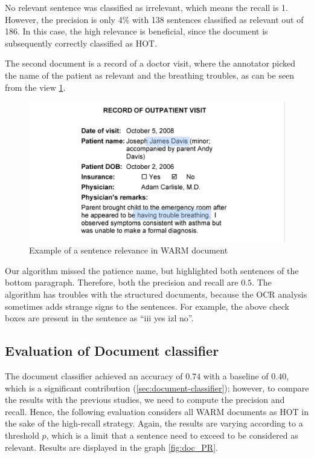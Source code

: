 \documentclass[
  digital, %
  notable,   %
  nolof,     %
  nolot,     %
]{fithesis3}
\begin{document}
No relevant sentence was classified as irrelevant, which means the recall is 1.
However, the precision is only 4\% with 138 sentences classified as relevant out of 186.
In this case, the high relevance is beneficial, since the document is subsequently correctly classified as HOT.

The second document is a record of a doctor visit, where the annotator picked the name of the patient as relevant and the breathing troubles, as can be seen from the view \ref{fig:sent_example}.

\begin{figure}[H]
\caption{Example of a sentence relevance in WARM document}
\label{fig:sent_example}
\includegraphics[width=\textwidth]{img/sent_example}
\end{figure}

Our algorithm missed the patience name, but highlighted both sentences of the bottom paragraph.
Therefore, both the precision and recall are $0.5$.
The algorithm has troubles with the structured documents, because the OCR analysis sometimes adds strange signs to the sentences.
For example, the above check boxes are present in the sentence as ``iii yes izl no''.

\subsection{Evaluation of Document classifier}
The document classifier achieved an accuracy of $0.74$ with a baseline of $0.40$, which is  a significant contribution (\ref{sec:document-classifier}); however, to compare the results with the previous studies, we need to compute the precision and recall.
Hence, the following evaluation considers all WARM documents as HOT in the sake of the high-recall strategy.
Again, the results are varying according to a threshold $p$, which is a limit that a sentence need to exceed to be considered as relevant.
Results are displayed in the graph \ref{fig:doc_PR}.
\end{document}
